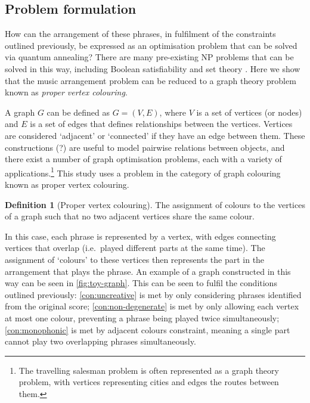 \documentclass[12pt]{article}
\theoremstyle{definition}
\newtheorem*{definition}{Definition}
\begin{document}
\subsection{Problem formulation}

How can the arrangement of these phrases, in fulfilment of the constraints outlined previously, be expressed as an optimisation problem that can be solved via quantum annealing? There are many pre-existing NP problems that can be solved in this way, including Boolean satisfiability and set theory \cite{lucas_ising_2014}. Here we show that the music arrangement problem can be reduced to a graph theory problem known as \emph{proper vertex colouring}.

A graph $G$ can be defined as $G=(V,E)$, where $V$ is a set of vertices (or nodes) and $E$ is a set of edges that defines relationships between the vertices. Vertices are considered `adjacent' or `connected' if they have an edge between them. These constructions (?) are useful to model pairwise relations between objects, and there exist a number of graph optimisation problems, each with a variety of applications.\footnote{The travelling salesman problem is often represented as a graph theory problem, with vertices representing cities and edges the routes between them.} This study uses a problem in the category of graph colouring known as proper vertex colouring.

\begin{definition}[Proper vertex colouring]
    The assignment of colours to the vertices of a graph such that no two adjacent vertices share the same colour.
\end{definition}

In this case, each phrase is represented by a vertex, with edges connecting vertices that overlap (i.e.\ played different parts at the same time). The assignment of `colours' to these vertices then represents the part in the arrangement that plays the phrase. An example of a graph constructed in this way can be seen in \cref{fig:toy-graph}. This can be seen to fulfil the conditions outlined previously: \cref{con:uncreative} is met by only considering phrases identified from the original score; \cref{con:non-degenerate} is met by only allowing each vertex at most one colour, preventing a phrase being played twice simultaneously; \cref{con:monophonic} is met by adjacent colours constraint, meaning a single part cannot play two overlapping phrases simultaneously. 
\end{document}
